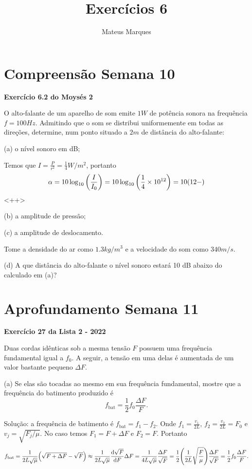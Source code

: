 \documentclass[a4paper,10pt]{article}
\title{\Huge{\textbf{Exercícios 6}}}
\author{Mateus Marques}
\newcommand{\fbat}{f_{\text{bat}}}
\begin{document}
\maketitle

\section{Compreensão Semana 10}

\textbf{Exercício 6.2 do Moysés 2}

O alto-falante de um aparelho de som emite $1 \unit{W}$ de potência sonora na frequência
$f = 100 \unit{Hz}$. Admitindo que o som se distribui uniformemente em todas as direções,
determine, num ponto situado a $2 \unit{m}$ de distância do alto-falante:

\n\n

(a) o nível sonoro em dB;

Temos que $I = \frac{P}{r^2} = \frac{1}{4} \unit{W/m^2}$, portanto
$$
\alpha = 10 \log_{10}\qty(\frac{I}{I_0}) = 10 \log_{10}\qty(\frac{1}{4} \times 10^{12}) = 10 \qty(12 -  )
$$
<++>

\n

(b) a amplitude de pressão;

\n

(c) a amplitude de deslocamento.

\n

Tome a densidade do ar como $1.3 \unit{kg/m^3}$ e a velocidade do som como $340 \unit{m/s}$.

(d) A que distância do alto-falante o nível sonoro estará 10 dB abaixo do calculado em (a)?



\section{Aprofundamento Semana 11}

\textbf{Exercício 27 da Lista 2 - 2022}


Duas cordas idênticas sob a mesma tensão $F$ possuem uma frequência fundamental igual a $f_0$. A seguir, a tensão em uma delas é aumentada de um valor bastante pequeno $\Delta F$.

\n\n

(a) Se elas são tocadas ao mesmo em sua frequência fundamental, mostre que a frequência do batimento produzido é
$$
f_{\text{bat}} = \frac{1}{2} f_0 \frac{\Delta F}{F}.
$$

\n

Solução: a frequência de batimento é $\fbat = f_1 - f_2$. Onde $f_1 = \frac{v_1}{2L}$, $f_2 = \frac{v_2}{2L} = F_0$ e $v_j = \sqrt{F_j/\mu}$. No caso temos $F_1 = F + \Delta F$ e $F_2 = F$. Portanto
$$
\fbat = \frac{1}{2L\sqrt{\mu}} \qty(\sqrt{F+\Delta F} - \sqrt{F}) \approx
\frac{1}{2L\sqrt{\mu}} \dv{\sqrt{F}}{F} \Delta F = \frac{1}{4L\sqrt{\mu}} \frac{\Delta F}{\sqrt{F}} =
\frac{1}{2} \qty(\frac{1}{2L} \sqrt{\frac{F}{\mu}}) \frac{\Delta F}{\sqrt{F}} =\frac{1}{2} f_0 \frac{\Delta F}{F}.
$$
\end{document}
